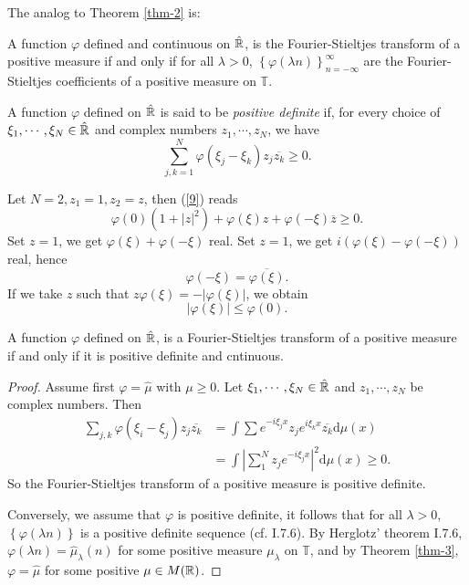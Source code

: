 The analog to Theorem \ref{thm-2} is:
\begin{theorem}\label{thm-3}
  A function $\varphi$ defined and continuous on $\hat{\mathbb{R}}$, is the Fourier-Stieltjes transform of a positive measure if and only if for all $\lambda>0$, $\left\{\varphi(\lambda n)\right\} _{n=-\infty}^{\infty}$ are the Fourier-Stieltjes coefficients of a positive measure on $\mathbb{T}$.
\end{theorem}


\begin{definition}
  A function $\varphi$ defined on $\hat{\mathbb{R}}$ is said to be \textit{positive definite} if, for every choice of $\xi_1,\cdots ,\xi_N \in \hat{\mathbb{R}}$ and complex numbers $z_1,\cdots ,z_N$, we have
  \begin{equation}
    \sum_{j,k=1}^{N} \varphi(\xi_j-\xi_k)z_j \overline{z_k}\ge 0.\label{9}
  \end{equation}
\end{definition}

Let $N=2,z_1=1,z_2=z$, then (\ref{9}) reads
\[
  \varphi(0)(1+|z|^2)+\varphi(\xi)z+\varphi(-\xi)\overline{z}\ge 0.
\] 
Set $z=1$, we get $\varphi(\xi)+\varphi(-\xi)$ real. Set $z=1$, we get $i(\varphi(\xi)-\varphi(-\xi))$ real, hence 
\begin{equation}
  \varphi(-\xi)=\overline{\varphi(\xi)}.
\end{equation}
If we take $z$ such that $z\varphi(\xi)=-|\varphi(\xi)|$, we obtain
\begin{equation}
  |\varphi(\xi)|\le \varphi(0).
\end{equation}

\begin{theorem}[Bochner]
  A function $\varphi$ defined on $\hat{\mathbb{R}}$, is a Fourier-Stieltjes transform of a positive measure if and only if it is positive definite and cntinuous.
\end{theorem}
\begin{proof}
  Assume first $\varphi=\hat{\mu}$ with $\mu\ge 0$. Let $\xi_1,\cdots ,\xi_N\in \hat{\mathbb{R}}$ and $z_1,\cdots ,z_N$ be complex numbers. Then
  \begin{align*}
    \sum_{j,k}^{} \varphi(\xi_i-\xi_j)z_j \overline{z_k}&= \int \sum e^{-i\xi_jx}z_je^{i\xi_kx}\overline{z_k}\mathrm{d}\mu(x)\\
    &=\int \left| \sum_{1}^{N} z_j e^{-i\xi_jx} \right| ^2\mathrm{d}\mu(x)\ge 0
  .\end{align*}
  So the Fourier-Stieltjes transform of a positive measure is positive definite.

  Conversely, we assume that $\varphi$ is positive definite, it follows that for all $\lambda>0$, $\left\{\varphi(\lambda n)\right\} $ is a positive definite sequence (cf. I.7.6). By Herglotz' theorem I.7.6, $\varphi(\lambda n)=\hat{\mu}_\lambda(n)$ for some positive measure $\mu_\lambda$ on $\mathbb{T}$, and by Theorem \ref{thm-3}, $\varphi=\hat{\mu}$ for some positive $\mu \in M(\mathbb{R})$.
\end{proof}

